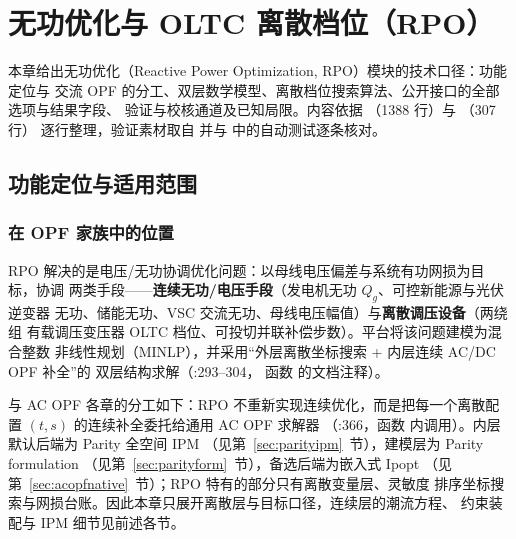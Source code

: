 \section{无功优化与 OLTC 离散档位（RPO）}\label{sec:rpo}

本章给出无功优化（Reactive Power Optimization, RPO）模块的技术口径：功能定位与
交流 OPF 的分工、双层数学模型、离散档位搜索算法、公开接口的全部选项与结果字段、
验证与校核通道及已知局限。内容依据
（1388 行）与
（307 行）
逐行整理，验证素材取自
 并与
 中的自动测试逐条核对。

\subsection{功能定位与适用范围}


\subsubsection*{在 OPF 家族中的位置}
RPO 解决的是电压/无功协调优化问题：以母线电压偏差与系统有功网损为目标，协调
两类手段——\textbf{连续无功/电压手段}（发电机无功 $Q_g$、可控新能源与光伏逆变器
无功、储能无功、VSC 交流无功、母线电压幅值）与\textbf{离散调压设备}（两绕组
有载调压变压器 OLTC 档位、可投切并联补偿步数）。平台将该问题建模为混合整数
非线性规划（MINLP），并采用“外层离散坐标搜索 + 内层连续 AC/DC OPF 补全”的
双层结构求解（:293--304，
函数  的文档注释）。

与 AC OPF 各章的分工如下：RPO 不重新实现连续优化，而是把每一个离散配置
$(t,s)$ 的连续补全委托给通用 AC OPF 求解器 
（:366，函数
 内调用）。内层默认后端为 Parity 全空间 IPM
（见第~\ref{sec:parityipm}~节），建模层为 Parity formulation
（见第~\ref{sec:parityform}~节），备选后端为嵌入式 Ipopt
（见第~\ref{sec:acopfnative}~节）；RPO 特有的部分只有离散变量层、灵敏度
排序坐标搜索与网损台账。因此本章只展开离散层与目标口径，连续层的潮流方程、
约束装配与 IPM 细节见前述各节。

